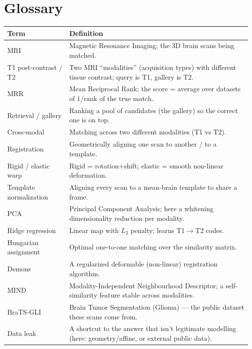 \documentclass[12pt,a4paper]{article}
\begin{document}
\section{Glossary}
\begin{center}\small
\begin{tabularx}{\linewidth}{@{}l X@{}}\toprule
\textbf{Term} & \textbf{Definition}\\\midrule
MRI & Magnetic Resonance Imaging; the 3D brain scans being matched.\\
T1 post-contrast / T2 & Two MRI ``modalities'' (acquisition types) with different tissue contrast; query is T1, gallery is T2.\\
MRR & Mean Reciprocal Rank; the score = average over datasets of $1/\text{rank of the true match}$.\\
Retrieval / gallery & Ranking a pool of candidates (the gallery) so the correct one is on top.\\
Cross-modal & Matching across two different modalities (T1 vs T2).\\
Registration & Geometrically aligning one scan to another / to a template.\\
Rigid / elastic warp & Rigid = rotation+shift; elastic = smooth non-linear deformation.\\
Template normalization & Aligning every scan to a mean-brain template to share a frame.\\
PCA & Principal Component Analysis; here a whitening dimensionality reduction per modality.\\
Ridge regression & Linear map with $L_2$ penalty; learns T1$\rightarrow$T2 codes.\\
Hungarian assignment & Optimal one-to-one matching over the similarity matrix.\\
Demons & A regularized deformable (non-linear) registration algorithm.\\
MIND & Modality-Independent Neighbourhood Descriptor; a self-similarity feature stable across modalities.\\
BraTS-GLI & Brain Tumor Segmentation (Glioma) — the public dataset these scans come from.\\
Data leak & A shortcut to the answer that isn't legitimate modelling (here: geometry/affine, or external public data).\\
\bottomrule\end{tabularx}\end{center}
\end{document}
